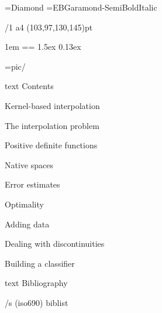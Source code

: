 \useOpTeX  %


\hyperlinks \Black \Black
{}

\enlang
\fontfam[TypewriterMT]
\fontfam[GaramondMT]\let\semibold\relax \typosize[12.5/14.7]%



\font\symbols=Diamond %
\def\QED{\hbox{\symbols\resizethefont \,❖}}
\font\boldmathfont=EBGaramond-SemiBoldItalic
\famvardef\tt{\TypewriterMT{}\typoscale[870/]\rm}


\margins/1 a4 (103,97,130,145)pt


\parindent 1em
\iindent=\parindent \ttindent=\parindent
\parskip 1.5ex
 0.13ex

\picdir={pic/}

\bgroup
\let\_mtext\ignoreit
\nonum\notoc\chap Contents
\egroup
\tocpage

\chap Kernel-based interpolation

\sec The interpolation problem


\sec[positivesec] Positive definite functions


\sec Native spaces


\sec[errorsec] Error estimates


\sec Optimality


\sec[addingsec] Adding data


\chap Dealing with discontinuities

\sec[buildingsec] Building a classifier










\bgroup
\let\_mtext\ignoreit
\nonum\chap Bibliography

\def\_opwarning#1{}
\usebib/s (iso690) biblist
\egroup

\bye
